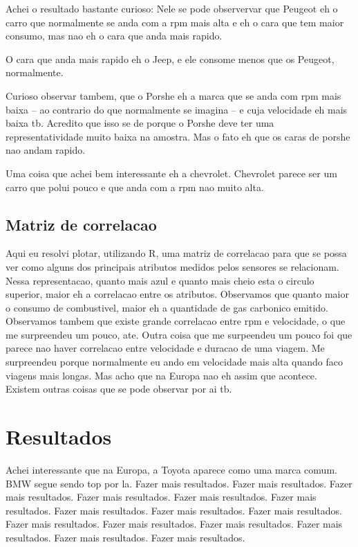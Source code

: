 \documentclass[10pt, conference]{IEEEtran}
\begin{document}
Achei o resultado bastante curioso: Nele se pode observervar que Peugeot eh o carro que normalmente se anda com
a rpm mais alta e eh o cara que tem maior consumo, mas nao eh o cara que anda mais rapido. 

O cara que anda mais rapido eh o Jeep, e ele consome menos que os Peugeot, normalmente.

Curioso observar tambem, que o Porshe eh a marca que se anda com rpm mais baixa -- ao contrario do que normalmente
se imagina -- e cuja velocidade eh mais baixa tb. Acredito que isso se de porque o Porshe deve ter uma
representatividade muito baixa na amostra. Mas o fato eh que os caras de porshe nao andam rapido.

Uma coisa que achei bem interessante eh a chevrolet. Chevrolet parece ser um carro que polui pouco e que
anda com a rpm nao muito alta.







\subsection{Matriz de correlacao}

Aqui eu resolvi plotar, utilizando R, uma matriz de correlacao para que se possa ver
como alguns dos principais atributos medidos pelos sensores se relacionam. Nessa
representacao, quanto mais azul e quanto mais cheio esta o circulo superior, maior
eh a correlacao entre os atributos. Observamos que quanto maior o consumo de combustivel,
maior eh a quantidade de gas carbonico emitido. Observamos tambem que existe grande
correlacao entre rpm e velocidade, o que me surpreendeu um pouco, ate. Outra coisa
que me surpeendeu um pouco foi que parece nao haver correlacao entre velocidade e duracao
de uma viagem. Me surpreendeu porque normalmente eu ando em velocidade mais alta quando
faco viagens mais longas. Mas acho que na Europa nao eh assim que acontece. Existem
outras coisas que se pode observar por ai tb.




\section{Resultados}
%
Achei interessante que na Europa, a Toyota aparece como uma marca comum. BMW segue sendo top por la.
Fazer mais resultados. Fazer mais resultados. Fazer mais resultados. Fazer mais resultados. Fazer mais resultados. 
Fazer mais resultados. Fazer mais resultados. Fazer mais resultados. Fazer mais resultados. Fazer mais resultados. 
Fazer mais resultados. Fazer mais resultados. Fazer mais resultados. Fazer mais resultados. Fazer mais resultados. 
\end{document}
